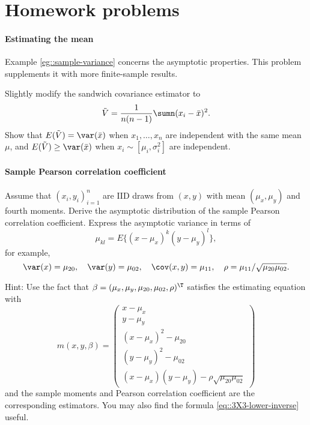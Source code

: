 %
%
%
%




\section{Homework problems}


\paragraph{Estimating the mean}\label{hw-math4::mean}

Example \ref{eg::sample-variance} concerns the asymptotic properties. This problem supplements it with more finite-sample results. 


Slightly modify the sandwich covariance estimator to 
$$
\tilde{V} = \frac{1}{n(n-1)} \sumn (x_i - \bar{x})^2.
$$
Show that $E(\tilde{V} ) = \var(\bar{x})$ when $x_1,\ldots, x_n$ are independent with the same mean $\mu$, and $E(\tilde{V} ) \geq  \var(\bar{x})$ when $x_i \sim [\mu_i, \sigma_i^2]$ are independent. 


\paragraph{Sample Pearson correlation coefficient}\label{hw-math4::pearson-cor-asym}

Assume that $(x_i, y_i)_{i=1}^n$ are IID draws from $(x,y)$ with mean $(\mu_x, \mu_y)$ and fourth moments. Derive the asymptotic distribution of the sample Pearson correlation coefficient. Express the asymptotic variance in terms of
$$
\mu_{kl} = E\{  (x-\mu_x)^k (y-\mu_y)^l \},
$$
for example, 
$$
\var(x) = \mu_{20}, \quad  \var(y) = \mu_{02},   \quad \cov(x,y) = \mu_{11},  \quad \rho = \mu_{11} / \sqrt{ \mu_{20}   \mu_{02} } .
$$

Hint: Use the fact that $\beta = (\mu_x, \mu_y, \mu_{20}, \mu_{02}, \rho)^{\T}$ satisfies the estimating equation with
$$
m(x,y,\beta) = \begin{pmatrix}
x - \mu_x \\
y - \mu_y \\
(x - \mu_x)^2 - \mu_{20} \\
(y - \mu_y)^2 - \mu_{02} \\
(x - \mu_x)(y - \mu_y) - \rho \sqrt{ \mu_{20}  \mu_{02} }
\end{pmatrix}
$$
and the sample moments and Pearson correlation coefficient are the corresponding estimators. 
You may also find the formula \eqref{eq::3X3-lower-inverse} useful. 


